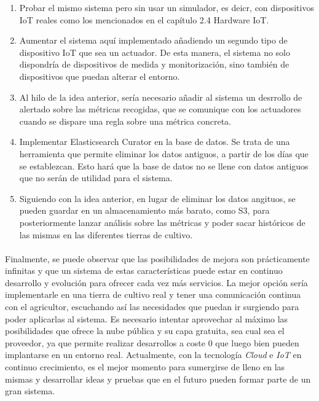 \documentclass[../../memoria.tex]{subfiles}
\begin{document}
\begin{enumerate}
    \item Probar el mismo sistema pero sin usar un simulador, es deicr, con dispositivos IoT reales como los mencionados en el capítulo 2.4 Hardware IoT.
    \item Aumentar el sistema aquí implementado añadiendo un segundo tipo de dispositivo IoT que sea un actuador. De esta manera, el sistema no solo dispondría de dispositivos de medida y monitorización, sino también de dispositivos que puedan alterar el entorno.
    \item Al hilo de la idea anterior, sería necesario añadir al sistema un desrrollo de alertado sobre las métricas recogidas, que se comunique con los actuadores cuando se dispare una regla sobre una métrica concreta.
    \item Implementar Elasticsearch Curator \cite{elasticsearchcurator} en la base de datos. Se trata de una herramienta que permite eliminar los datos antiguos, a partir de los días que se establezcan. Esto hará que la base de datos no se llene con datos antiguos que no serán de utilidad para el sistema.
    \item Siguiendo con la idea anterior, en lugar de eliminar los datos angituos, se pueden guardar en un almacenamiento más barato, como S3, para posteriormente lanzar análisis sobre las métricas y poder sacar históricos de las mismas en las diferentes tierras de cultivo.
\end{enumerate}

\paragraph{}
Finalmente, se puede observar que las posibilidades de mejora son prácticamente infinitas y que un sistema de estas características puede estar en continuo desarrollo y evolución para ofrecer cada vez más servicios. La mejor opción sería implementarle en una tierra de cultivo real y tener una comunicación continua con el agricultor, escuchando así las necesidades que puedan ir surgiendo para poder aplicarlas al sistema. Es necesario intentar aprovechar al máximo las posibilidades que ofrece la nube pública y su capa gratuita, sea cual sea el proveedor, ya que permite realizar desarrollos a coste 0 que luego bien pueden implantarse en un entorno real. Actualmente, con la tecnología \textit{Cloud} e \textit{IoT} en continuo crecimiento, es el mejor momento para sumergirse de lleno en las mismas y desarrollar ideas y pruebas que en el futuro pueden formar parte de un gran sistema.
\end{document}
